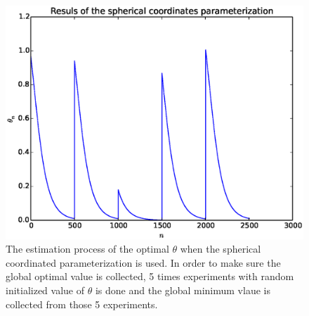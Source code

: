 \documentclass[a4paper,12pt]{article}
\begin{document}
\begin{figure}[H]
\begin{center}
\includegraphics[width=1.0\linewidth]{line_est_sphe.eps}


\end{center}
   \caption{The estimation process of the optimal $\theta$ when the spherical coordinated parameterization is used. In order to make sure the global optimal value is collected, 5 times experiments with random initialized value of $\theta$ is done and the global minimum vlaue is collected from those 5 experiments.}
\label{fig:line_result_sphe}
\end{figure}




\end{document}
